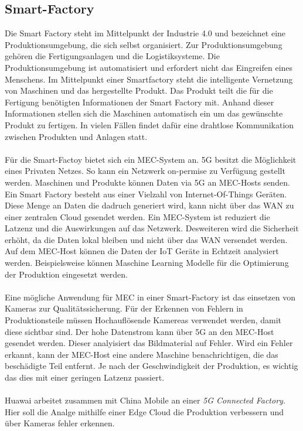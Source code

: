 \documentclass[runningheads]{llncs}
\numberwithin{figure}{section}
\begin{document}
\subsection{Smart-Factory}
Die Smart Factory steht im Mittelpunkt der Industrie 4.0 und bezeichnet eine Produktionsumgebung, die sich selbst organisiert. 
Zur Produktionsumgebung gehören die Fertigungsanlagen und die Logistiksysteme. Die Produktionsumgebung ist automatisiert und erfordert
nicht das Eingreifen eines Menschens. 
Im Mittelpunkt einer Smartfactory steht die intelligente Vernetzung von Maschinen und das hergestellte Produkt. 
Das Produkt teilt die für die Fertigung benötigten Informationen der Smart Factory mit. 
Anhand dieser Informationen stellen sich die Maschinen automatisch ein um das gewünschte Produkt zu fertigen. 
In vielen Fällen findet dafür eine drahtlose Kommunikation zwischen Produkten und Anlagen statt. 
\\
\\
Für die Smart-Factoy bietet sich ein MEC-System an. 5G besitzt die Möglichkeit eines Privaten Netzes. 
So kann ein Netzwerk on-permise zu Verfügung gestellt werden. Maschinen und Produkte können Daten via 5G an MEC-Hosts senden.
Ein Smart Factory besteht aus einer Vielzahl von Internet-Of-Things Geräten. Diese Menge an Daten die dadruch 
generiert wird, kann nicht über das WAN zu einer zentralen Cloud gesendet werden. Ein MEC-System ist reduziert die Latzenz
und die Auswirkungen auf das Netzwerk. Desweiteren wird die Sicherheit erhöht, da die Daten lokal bleiben und nicht über 
das WAN versendet werden. Auf dem MEC-Host können die Daten der IoT Geräte in Echtzeit analysiert werden. Beispielsweise können
Maschine Learning Modelle für die Optimierung der Produktion eingesetzt werden. 
\\
\\
Eine mögliche Anwendung für MEC in einer Smart-Factory ist das einsetzen von Kameras zur Qualitätssicherung.
Für der Erkennen von Fehlern in Produktionsteile müssen Hochauflösende Kamereas verwendet werden, damit diese sichtbar sind.  Der hohe Datenstrom
kann über 5G an den MEC-Host gesendet werden. Dieser analyisiert das Bildmaterial auf Fehler. Wird ein Fehler erkannt,
kann der MEC-Host eine andere Maschine benachrichtigen, die das beschädigte Teil entfernt. Je nach der Geschwindigkeit der Produktion,
es wichtig das dies mit einer geringen Latzenz passiert. 
\\
\\
Huawai arbeitet zusammen mit China Mobile an einer \textit{5G Connected Factory}. Hier soll die Analge mithilfe 
einer Edge Cloud die Produktion verbessern und über Kameras fehler erkennen. \cite{WhatNextgenFactory}
\end{document}
